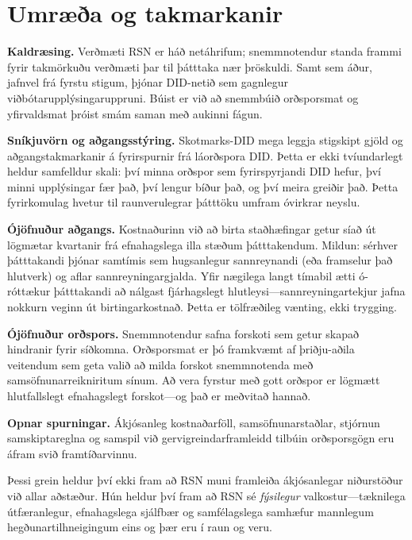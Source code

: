 \documentclass[11pt,a4paper,twocolumn]{article}
\begin{document}
\section{Umræða og takmarkanir}

\textbf{Kaldræsing.} Verðmæti RSN er háð netáhrifum; snemmnotendur standa frammi fyrir takmörkuðu verðmæti þar til þátttaka nær þröskuldi. Samt sem áður, jafnvel frá fyrstu stigum, þjónar DID-netið sem gagnlegur viðbótarupplýsingaruppruni. Búist er við að snemmbúið orðsporsmat og yfirvaldsmat þróist smám saman með aukinni fágun.

\textbf{Sníkjuvörn og aðgangsstýring.} Skotmarks-DID mega leggja stigskipt gjöld og aðgangstakmarkanir á fyrirspurnir frá láorðspora DID. Þetta er ekki tvíundarlegt heldur samfelldur skali: því minna orðspor sem fyrirspyrjandi DID hefur, því minni upplýsingar fær það, því lengur bíður það, og því meira greiðir það. Þetta fyrirkomulag hvetur til raunverulegrar þátttöku umfram óvirkrar neyslu.

\textbf{Ójöfnuður aðgangs.} Kostnaðurinn við að birta staðhæfingar getur síað út lögmætar kvartanir frá efnahagslega illa stæðum þátttakendum. Mildun: sérhver þátttakandi þjónar samtímis sem hugsanlegur sannreynandi (eða framselur það hlutverk) og aflar sannreyningargjalda. Yfir nægilega langt tímabil ætti ó-róttækur þátttakandi að nálgast fjárhagslegt hlutleysi---sannreyningartekjur jafna nokkurn veginn út birtingarkostnað. Þetta er tölfræðileg vænting, ekki trygging.

\textbf{Ójöfnuður orðspors.} Snemmnotendur safna forskoti sem getur skapað hindranir fyrir síðkomna. Orðsporsmat er þó framkvæmt af þriðju-aðila veitendum sem geta valið að milda forskot snemmnotenda með samsöfnunarreikniritum sínum. Að vera fyrstur með gott orðspor er lögmætt hlutfallslegt efnahagslegt forskot---og það er meðvitað hannað.

\textbf{Opnar spurningar.} Ákjósanleg kostnaðarföll, samsöfnunarstaðlar, stjórnun samskiptareglna og samspil við gervigreindarframleidd tilbúin orðsporsgögn eru áfram svið framtíðarvinnu.

Þessi grein heldur því ekki fram að RSN muni framleiða ákjósanlegar niðurstöður við allar aðstæður. Hún heldur því fram að RSN sé \emph{fýsilegur} valkostur---tæknilega útfæranlegur, efnahagslega sjálfbær og samfélagslega samhæfur mannlegum hegðunartilhneigingum eins og þær eru í raun og veru.
\end{document}
